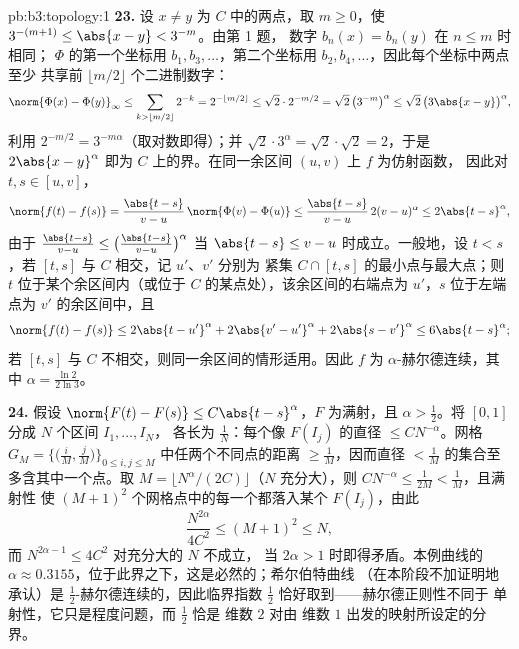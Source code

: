 \begin{solution}{pb:b3:topology:1}
\textbf{23.} 设 $x \neq y$ 为 $C$ 中的两点，取 $m \geq 0$，使
$3^{-(m+1)} \leq \abs{x - y} < 3^{-m}$。由第 1 题，
数字 $b_n(x) = b_n(y)$ 在 $n \leq m$ 时相同；
$\Phi$ 的第一个坐标用 $b_1, b_3, \dots$，第二个坐标用 $b_2,
b_4, \dots$，因此每个坐标中两点至少
共享前 $\lfloor m/2\rfloor$ 个二进制数字：
\[
\norm{\Phi(x) - \Phi(y)}_\infty
\leq \sum_{k > \lfloor m/2\rfloor}2^{-k}
= 2^{-\lfloor m/2\rfloor} \leq \sqrt2\cdot2^{-m/2}
= \sqrt2\,\bigl(3^{-m}\bigr)^\alpha
\leq \sqrt2\,\bigl(3\abs{x-y}\bigr)^\alpha,
\]
利用 $2^{-m/2} = 3^{-m\alpha}$（取对数即得）；并
$\sqrt2\cdot3^\alpha = \sqrt2\cdot\sqrt2 = 2$，于是
$2\abs{x-y}^\alpha$ 即为 $C$ 上的界。在同一余区间 $(u, v)$ 上 $f$ 为仿射函数，
因此对 $t, s \in [u, v]$，
\[
\norm{f(t) - f(s)} = \frac{\abs{t-s}}{v-u}\,
\norm{\Phi(v) - \Phi(u)}
\leq \frac{\abs{t-s}}{v-u}\,2(v-u)^\alpha
\leq 2\abs{t-s}^\alpha,
\]
由于 $\frac{\abs{t-s}}{v-u} \leq \bigl(\frac{\abs{t-s}}
{v-u}\bigr)^\alpha$ 当 $\abs{t-s} \leq v - u$ 时成立。一般地，设 $t <
s$，若 $[t, s]$ 与 $C$ 相交，记 $u'$、$v'$ 分别为
紧集 $C \cap [t, s]$ 的最小点与最大点；则 $t$
位于某个余区间内（或位于 $C$ 的某点处），该余区间的右端点为
$u'$，$s$ 位于左端点为 $v'$ 的余区间中，且
\[
\norm{f(t) - f(s)} \leq 2\abs{t - u'}^\alpha
+ 2\abs{v' - u'}^\alpha + 2\abs{s - v'}^\alpha
\leq 6\abs{t - s}^\alpha ;
\]
若 $[t, s]$ 与 $C$ 不相交，则同一余区间的情形适用。因此 $f$ 为
$\alpha$-赫尔德连续，其中 $\alpha = \frac{\ln2}{2\ln3}$。

\textbf{24.} 假设 $\norm{F(t) - F(s)} \leq
C\abs{t-s}^\alpha$，$F$ 为满射，且 $\alpha >
\frac12$。将 $[0,1]$ 分成 $N$ 个区间 $I_1, \dots, I_N$，
各长为 $\frac1N$：每个像 $F(I_j)$ 的直径 $\leq
CN^{-\alpha}$。网格 $G_M =
\bigl\{\bigl(\frac iM, \frac jM\bigr)\bigr\}_{0 \leq i, j
\leq M}$ 中任两个不同点的距离 $\geq \frac1M$，因而直径
$< \frac1M$ 的集合至多含其中一个点。取 $M =
\lfloor N^\alpha/(2C)\rfloor$（$N$ 充分大），则
$CN^{-\alpha} \leq \frac1{2M} < \frac1M$，且满射性
使 $(M+1)^2$ 个网格点中的每一个都落入某个
$F(I_j)$，由此
\[
\frac{N^{2\alpha}}{4C^2} \leq (M + 1)^2 \leq N,
\]
而 $N^{2\alpha - 1} \leq 4C^2$ 对充分大的 $N$ 不成立，
当 $2\alpha > 1$ 时即得矛盾。本例曲线的 $\alpha \approx
0.3155$，位于此界之下，这是必然的；希尔伯特曲线
（在本阶段不加证明地承认）是 $\frac12$-赫尔德连续的，因此临界指数
$\frac12$ 恰好取到——赫尔德正则性不同于
单射性，它只是程度问题，而 $\frac12$ 恰是
维数 $2$ 对由
维数 $1$ 出发的映射所设定的分界。


\end{solution}
